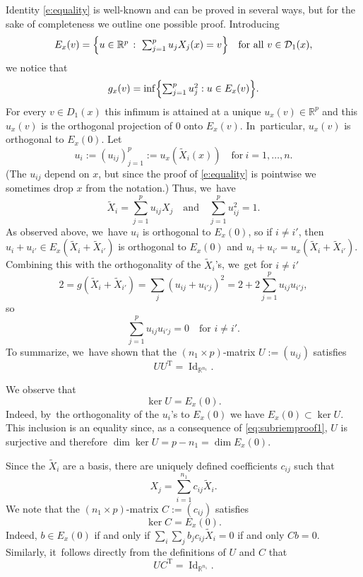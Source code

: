 \documentclass[11pt]{article}
\DeclareMathOperator{\Id}{Id}
\theoremstyle{definition}
\newcommand{\1}{\mathbbm{1}}
\newcommand{\R}{\mathbb{R}}
\numberwithin{equation}{section}
\begin{document}
Identity \eqref{e:equality} is well-known and can be proved in several ways, but for the sake of completeness we outline one possible proof. Introducing
\[
E_x(v)= \Bigl\{\textstyle u\in \mathbb R^p\,:\ \sum_{j=1}^{p} u_j X_j(x) =v\Bigr\}
\quad\text{for all}\ v\in \mathcal D_1(x),
\]
we notice that
\[
g_x(v) = \inf\Bigl\{ \textstyle\sum_{j=1}^p u_j^2 : u\in E_x(v)\Bigr\}.
\]
For every $v\in D_1(x)$ this infimum is attained at a unique $u_x(v)\in \mathbb R^p$ and this $u_x(v)$ is the orthogonal projection of $0$ onto $E_x(v)$. In~particular, $u_x(v)$ is orthogonal to $E_x(0)$. Let
\[
u_i := (u_{ij})_{j=1}^p := u_x(\tilde X_i(x))
\quad\text{for}\ i=1,\ldots, n.
\]
(The $u_{ij}$ depend on $x$, but since the proof of \eqref{e:equality} is pointwise we sometimes drop $x$ from the notation.) Thus, we~have
\[
\tilde{X}_i=\sum_{j=1}^p u_{ij} X_j
\quad\text{and}\quad\sum_{j=1}^p u_{ij}^2=1.
\]
As observed above, we~have $u_i$ is orthogonal to $E_x(0)$, so if $i\neq i'$, then $u_i+ u_{i'}\in E_x(\tilde{X}_i+\tilde X_{i'})$ is orthogonal to $E_x(0)$ and $u_i + u_{i'} = u_x(\tilde{X}_i+\tilde X_{i'})$. Combining this with the orthogonality of the $\tilde{X}_i$'s, we~get for $i\neq i'$
\[
2= g(\tilde X_i+\tilde X_{i'})= \sum_j (u_{ij} +u_{i'j})^2 = 2 +2 \sum_{j=1}^p u_{ij} u_{i' j},
\]
so
\[
\sum_{j=1}^p u_{ij} u_{i' j}=0 \quad\text{for } i\neq i'.
\]
To summarize, we~have shown that the $(n_1\times p)$-matrix $U:=(u_{ij})$ satisfies
\begin{equation}
\label{eq:subriemproof1}
U U^\mathrm{T} = {\Id_{\R^{n_1}}}.
\end{equation}

We observe that
\begin{equation}
\label{eq:subriemproof3}
\ker U = E_x(0).
\end{equation}
Indeed, by~the orthogonality of the $u_i$'s to $E_x(0)$ we have $E_x(0)\subset \ker U$. This inclusion is an equality since, as a consequence of \eqref{eq:subriemproof1}, $U$ is surjective and therefore $\dim \ker U = p - n_1 = \dim E_x(0)$.

Since the $\tilde X_i$ are a basis, there are uniquely defined coefficients $c_{ij}$ such that
\[
X_j =\sum_{i=1}^{n_1} c_{ij} \tilde X_i.
\]
We note that the $(n_1\times p)$-matrix $C :=(c_{ij})$ satisfies
\begin{equation}
\label{eq:subriemproof4}
\ker C = E_x(0).
\end{equation}
Indeed, $b\in E_x(0)$ if and only if $\sum_i \sum_j b_j c_{ij} \tilde X_i = 0$ if and only $C b =0$. Similarly, it~follows directly from the definitions of $U$ and $C$ that
\begin{equation}
\label{eq:subriemproof2}
U C^\mathrm{T} = {\Id_{\R^{n_1}}}.
\end{equation}
\end{document}
